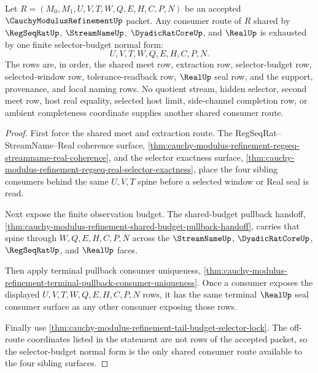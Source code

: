\begin{theorem}
\label{thm:cauchy-modulus-refinement-selector-budget-normal-form}
Let $R=(M_0,M_1,U,V,T,W,Q,E,H,C,P,N)$ be an accepted $\CauchyModulusRefinementUp$ packet. Any consumer route of $R$ shared by $\RegSeqRatUp$, $\StreamNameUp$, $\DyadicRatCoreUp$, and $\RealUp$ is exhausted by one finite selector-budget normal form:
$$
U,V,T,W,Q,E,H,C,P,N.
$$
The rows are, in order, the shared meet row, extraction row, selector-budget row, selected-window row, tolerance-readback row, $\RealUp$ seal row, and the support, provenance, and local naming rows. No quotient stream, hidden selector, second meet row, host real equality, selected host limit, side-channel completion row, or ambient completeness coordinate supplies another shared consumer route.
\end{theorem}
\begin{proof}
First force the shared meet and extraction route. The RegSeqRat--StreamName--Real coherence surface, \autoref{thm:cauchy-modulus-refinement-regseq-streamname-real-coherence}, and the selector exactness surface, \autoref{thm:cauchy-modulus-refinement-regseq-real-selector-exactness}, place the four sibling consumers behind the same $U,V,T$ spine before a selected window or Real seal is read.

Next expose the finite observation budget. The shared-budget pullback handoff, \autoref{thm:cauchy-modulus-refinement-shared-budget-pullback-handoff}, carries that spine through $W,Q,E,H,C,P,N$ across the $\StreamNameUp$, $\DyadicRatCoreUp$, $\RegSeqRatUp$, and $\RealUp$ faces.

Then apply terminal pullback consumer uniqueness, \autoref{thm:cauchy-modulus-refinement-terminal-pullback-consumer-uniqueness}. Once a consumer exposes the displayed $U,V,T,W,Q,E,H,C,P,N$ rows, it has the same terminal $\RealUp$ seal consumer surface as any other consumer exposing those rows.

Finally use \autoref{thm:cauchy-modulus-refinement-tail-budget-selector-lock}. The off-route coordinates listed in the statement are not rows of the accepted packet, so the selector-budget normal form is the only shared consumer route available to the four sibling surfaces.
\end{proof}

